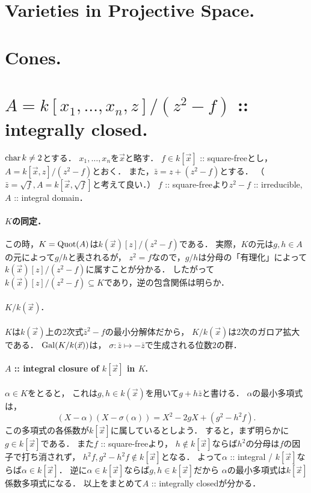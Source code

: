 \documentclass[a4paper]{jsarticle}
\begin{document}
\section{Varieties in Projective Space.} %

\section{Cones.} %

\section{$A=k[x_1,\dots,x_n,z]/(z^2-f)$ :: integrally closed.} %
    $\operatorname{char} k \neq 2$とする．
    $x_1,\dots,x_n$を$\vec{x}$と略す．
    $f \in k[\vec{x}]$ :: square-freeとし，
    $A=k[\vec{x},z]/(z^2-f)$とおく．
    また，$\bar{z}=z+(z^2-f)$とする．
    （$\bar{z}=\sqrt{f}, A=k[\vec{x}, \sqrt{f}]$と考えて良い．）
    $f$ :: square-freeより$z^2-f$ :: irreducible, $A$ :: integral domain．

    \paragraph{$K$の同定．}
    この時，$K=\operatorname{Quot}(A)$は$k(\vec{x})[z]/(z^2-f)$である．
    実際，$K$の元は$g,h \in A$の元によって$g/h$と表されるが，
    $z^2=f$なので，$g/h$は分母の「有理化」によって$k(\vec{x})[z]/(z^2-f)$に属すことが分かる．
    したがって$k(\vec{x})[z]/(z^2-f) \subseteq K$であり，逆の包含関係は明らか．

    \paragraph{$K/k(\vec{x})$.}
    $K$は$k(\vec{x})$上の2次式$\bar{z}^2-f$の最小分解体だから，
    $K/k(\vec{x})$は2次のガロア拡大である．
    $\operatorname{Gal}(K/k(\vec{x}))$は，
    $\sigma: \bar{z} \mapsto -\bar{z}$で生成される位数$2$の群．

    \paragraph{$A$ :: integral closure of $k[\vec{x}]$ in $K$.}
    $\alpha \in K$をとると，
    これは$g,h \in k(\vec{x})$を用いて$g+h\bar{z}$と書ける．
    $\alpha$の最小多項式は，
    \[ (X-\alpha)(X-\sigma(\alpha))=X^2-2gX + (g^2 - h^2 f). \]
    この多項式の各係数が$k[\vec{x}]$に属しているとしよう．
    すると，まず明らかに$g \in k[\vec{x}]$である．
    また$f$ :: square-freeより，
    $h \not \in k[\vec{x}]$ならば$h^2$の分母は$f$の因子で打ち消されず，
    $h^2 f, g^2 - h^2 f\not \in k[\vec{x}]$となる．
    よって$\alpha$ :: integral / $k[\vec{x}]$ならば$\alpha \in k[\vec{x}]$．
    逆に$\alpha \in k[\vec{x}]$ならば$g,h \in k[\vec{x}]$だから
    $\alpha$の最小多項式は$k[\vec{x}]$係数多項式になる．
    以上をまとめて$A$ :: integrally closedが分かる．
\end{document}

